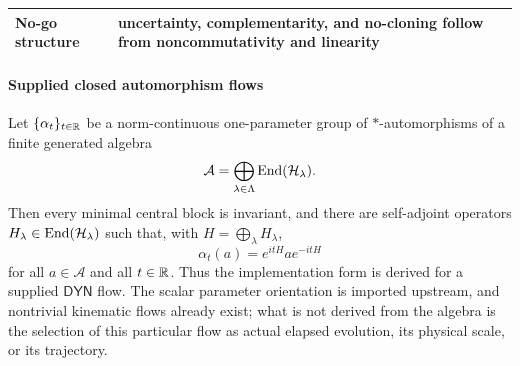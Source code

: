 \documentclass[12pt,a4paper]{article}
\begin{document}
\begin{table}[!htbp]
\begin{tabularx}{\textwidth}{>{\raggedright\arraybackslash}p{}
                                >{\raggedright\arraybackslash}X}
No-go structure & uncertainty, complementarity, and no-cloning follow from noncommutativity and linearity \\
\bottomrule
\end{tabularx}
\end{table}



\paragraph{Supplied closed automorphism flows}
\label{p4:sec:part1-unitary-flow}


\begin{theorem}
\label{p4:thm:inner-flow}
\leavevmode\par\noindent
Let \(\{\alpha_t\}_{t\in\mathbb{R}}\) be a norm-continuous one-parameter group of
\(*\)-automorphisms of a finite generated algebra
\[
\mathcal A=\bigoplus_{\lambda\in\Lambda}\operatorname{End}(\mathcal H_\lambda).
\]
Then every minimal central block is invariant, and there are self-adjoint
operators \(H_\lambda\in\operatorname{End}(\mathcal H_\lambda)\) such that, with
\(H=\bigoplus_\lambda H_\lambda\),
\begin{equation}
\label{p4:eq:inner-flow}
\alpha_t(a)=e^{itH}ae^{-itH}
\end{equation}
for all \(a\in\mathcal A\) and all \(t\in\mathbb{R}\).  Thus the implementation
form is derived for a supplied \(\mathsf{DYN}\) flow.  The scalar parameter
orientation is imported upstream, and nontrivial kinematic flows already
exist; what is not derived from the algebra is the selection of this
particular flow as actual elapsed evolution, its physical scale, or its
trajectory.
\end{theorem}
\end{document}
